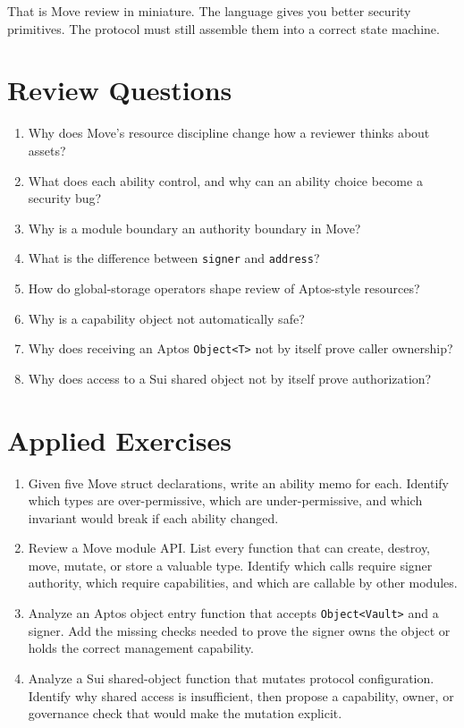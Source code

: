 That is Move review in miniature. The language gives you better security primitives. The protocol must still assemble them into a correct state machine.

\section*{Review Questions}

\begin{enumerate}
\item Why does Move's resource discipline change how a reviewer thinks about assets?
\item What does each ability control, and why can an ability choice become a security bug?
\item Why is a module boundary an authority boundary in Move?
\item What is the difference between \texttt{signer} and \texttt{address}?
\item How do global-storage operators shape review of Aptos-style resources?
\item Why is a capability object not automatically safe?
\item Why does receiving an Aptos \texttt{Object<T>} not by itself prove caller ownership?
\item Why does access to a Sui shared object not by itself prove authorization?
\end{enumerate}

\section*{Applied Exercises}

\begin{enumerate}
\item Given five Move struct declarations, write an ability memo for each. Identify which types are over-permissive, which are under-permissive, and which invariant would break if each ability changed.

\item Review a Move module API. List every function that can create, destroy, move, mutate, or store a valuable type. Identify which calls require signer authority, which require capabilities, and which are callable by other modules.

\item Analyze an Aptos object entry function that accepts \texttt{Object<Vault>} and a signer. Add the missing checks needed to prove the signer owns the object or holds the correct management capability.

\item Analyze a Sui shared-object function that mutates protocol configuration. Identify why shared access is insufficient, then propose a capability, owner, or governance check that would make the mutation explicit.
\end{enumerate}
